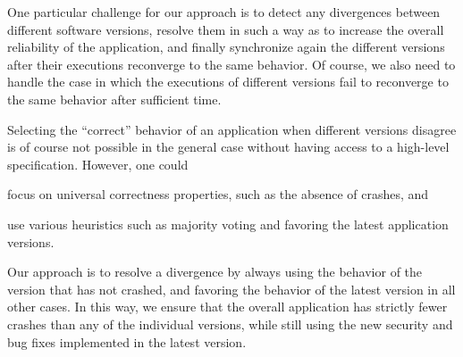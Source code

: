 One particular challenge for our approach is to detect any divergences between
different software versions, resolve them in such a way as to increase the
overall reliability of the application, and finally synchronize again the
different versions after their executions reconverge to the same behavior.  Of
course, we also need to handle the case in which the executions of different
versions fail to reconverge to the same behavior after sufficient time.

Selecting the ``correct'' behavior of an application when different versions
disagree is of course not possible in the general case without having access to
a high-level specification.  However, one could%
\begin{inparaenum}[(1)]
\item focus on universal
correctness properties, such as the absence of crashes, and
\item use various
heuristics such as majority voting and favoring the latest application
versions.
\end{inparaenum}
Our approach is to resolve a divergence by always using the behavior of the
version that has not crashed, and favoring the behavior of the latest version
in all other cases. In this way, we ensure that the overall application has
strictly fewer crashes than any of the individual versions, while still using
the new security and bug fixes implemented in the latest version.







